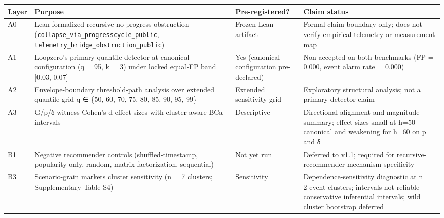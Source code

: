 \documentclass[
  11pt,
]{article}
\newcounter{none} %
\begin{document}
{\def\LTcaptype{none} %
\begin{longtable}[]{@{}
  >{\raggedright\arraybackslash}p{}
  >{\raggedright\arraybackslash}p{}
  >{\raggedright\arraybackslash}p{}
  >{\raggedright\arraybackslash}p{}@{}}
\toprule\noalign{}
\begin{minipage}[b]{\linewidth}\raggedright
Layer
\end{minipage} & \begin{minipage}[b]{\linewidth}\raggedright
Purpose
\end{minipage} & \begin{minipage}[b]{\linewidth}\raggedright
Pre-registered?
\end{minipage} & \begin{minipage}[b]{\linewidth}\raggedright
Claim status
\end{minipage} \\
\midrule\noalign{}
\endhead
\bottomrule\noalign{}
\endlastfoot
A0 & Lean-formalized recursive no-progress obstruction
(\texttt{collapse\_via\_progresscycle\_public},
\texttt{telemetry\_bridge\_obstruction\_public}) & Frozen Lean artifact
& Formal claim boundary only; does not verify empirical telemetry or
measurement map \\
A1 & Loopzero's primary quantile detector at canonical configuration (q
= 95, k = 3) under locked equal-FP band {[}0.03, 0.07{]} & Yes
(canonical configuration pre-declared) & Non-accepted on both benchmarks
(FP = 0.000, event alarm rate = 0.000) \\
A2 & Envelope-boundary threshold-path analysis over extended quantile
grid q ∈ \{50, 60, 70, 75, 80, 85, 90, 95, 99\} & Extended sensitivity
grid & Exploratory structural analysis; not a primary detector claim \\
A3 & G/p/δ witness Cohen's d effect sizes with cluster-aware BCa
intervals & Descriptive & Directional alignment and magnitude summary;
effect sizes small at h=50 canonical and weakening for h=60 on p and
δ \\
B1 & Negative recommender controls (shuffled-timestamp, popularity-only,
random, matrix-factorization, sequential) & Not yet run & Deferred to
v1.1; required for recursive-recommender mechanism specificity \\
B3 & Scenario-grain markets cluster sensitivity (n = 7 clusters;
Supplementary Table S4) & Sensitivity & Dependence-sensitivity
diagnostic at n = 2 event clusters; intervals not reliable conservative
inferential intervals; wild cluster bootstrap deferred \\
\end{longtable}
}
\end{document}
